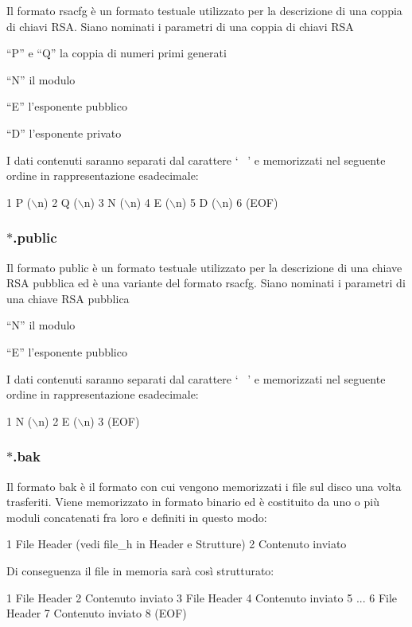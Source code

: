 Il formato rsacfg è un formato testuale utilizzato per la descrizione di una coppia di chiavi R\+SA. Siano nominati i parametri di una coppia di chiavi R\+SA
\begin{DoxyItemize}
\item “\+P” e “\+Q” la coppia di numeri primi generati
\item “\+N” il modulo
\item “\+E” l’esponente pubblico
\item “\+D” l’esponente privato
\item I dati contenuti saranno separati dal carattere ‘~\newline
’ e memorizzati nel seguente ordine in rappresentazione esadecimale\+: 
\begin{DoxyCode}
1 P (\(\backslash\)n)
2 Q (\(\backslash\)n)
3 N (\(\backslash\)n)
4 E (\(\backslash\)n)
5 D (\(\backslash\)n)
6 (EOF)
\end{DoxyCode}
 \subsubsection*{$\ast$.public}
\end{DoxyItemize}

Il formato public è un formato testuale utilizzato per la descrizione di una chiave R\+SA pubblica ed è una variante del formato rsacfg. Siano nominati i parametri di una chiave R\+SA pubblica
\begin{DoxyItemize}
\item “\+N” il modulo
\item “\+E” l’esponente pubblico
\end{DoxyItemize}

I dati contenuti saranno separati dal carattere ‘~\newline
’ e memorizzati nel seguente ordine in rappresentazione esadecimale\+: 
\begin{DoxyCode}
1 N (\(\backslash\)n)
2 E (\(\backslash\)n)
3 (EOF)
\end{DoxyCode}
 \subsubsection*{$\ast$.bak}

Il formato bak è il formato con cui vengono memorizzati i file sul disco una volta trasferiti. Viene memorizzato in formato binario ed è costituito da uno o più moduli concatenati fra loro e definiti in questo modo\+: 
\begin{DoxyCode}
1 File Header (vedi  file\_h in Header e Strutture)
2 Contenuto inviato
\end{DoxyCode}
 Di conseguenza il file in memoria sarà così strutturato\+: 
\begin{DoxyCode}
1 File Header
2 Contenuto inviato
3 File Header
4 Contenuto inviato
5 ...
6 File Header
7 Contenuto inviato
8 (EOF)
\end{DoxyCode}
